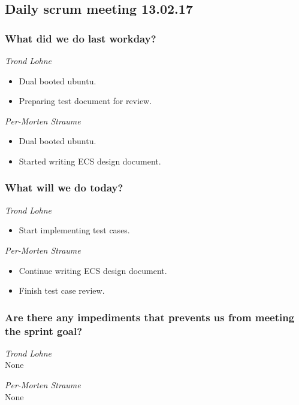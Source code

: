 \documentclass{article}
\begin{document}
\begin{center}
\subsection*{Daily scrum meeting 13.02.17}
\end{center}
\bigskip


\subsubsection*{What did we do last workday?}

\noindent\textit{Trond Lohne}
\begin{itemize}
	\item 
	Dual booted ubuntu.
	
    \item 
	Preparing test document for review.
\end{itemize}

\medskip

\noindent\textit{Per-Morten Straume}
\begin{itemize}
	\item 
	Dual booted ubuntu.
	
	\item 
	Started writing ECS design document.
\end{itemize}


\subsubsection*{What will we do today?}

\noindent\textit{Trond Lohne}
\begin{itemize}
	\item 
	Start implementing test cases.
\end{itemize}

\medskip

\noindent\textit{Per-Morten Straume}
\begin{itemize}
	\item 
	Continue writing ECS design document.
	
	\item 
	Finish test case review.
\end{itemize}


\subsubsection*{Are there any impediments that prevents us from meeting the sprint goal?}

\noindent\textit{Trond Lohne}\\
None

\medskip

\noindent\textit{Per-Morten Straume}\\
None
\end{document}
